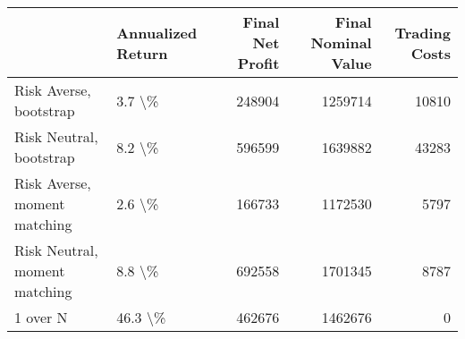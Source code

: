 \begin{tabular}{llrrr}
\toprule
{} & Annualized Return &  Final Net Profit &  Final Nominal Value &  Trading Costs \\
\midrule
Risk Averse, bootstrap        &            3.7 \textbackslash\% &            248904 &              1259714 &          10810 \\
Risk Neutral, bootstrap       &            8.2 \textbackslash\% &            596599 &              1639882 &          43283 \\
Risk Averse, moment matching  &            2.6 \textbackslash\% &            166733 &              1172530 &           5797 \\
Risk Neutral, moment matching &            8.8 \textbackslash\% &            692558 &              1701345 &           8787 \\
1 over N                      &           46.3 \textbackslash\% &            462676 &              1462676 &              0 \\
\bottomrule
\end{tabular}
